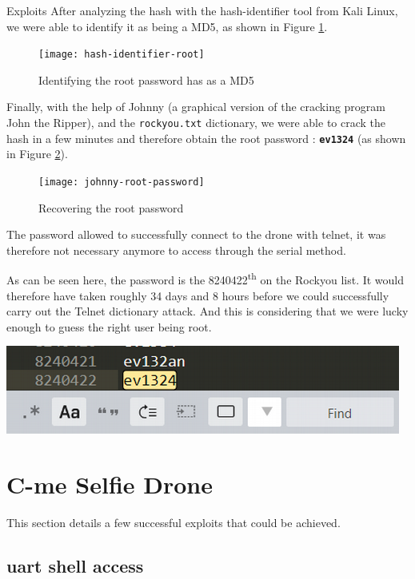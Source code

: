 \begin{chaptercover}{Exploits}
After analyzing the hash with the hash-identifier tool from Kali Linux, we were able to identify it as being a MD5, as shown in Figure \ref{fig:hash-identifier-root}.

\begin{figure}[H]
  \centering
  \texttt{[image: hash-identifier-root]}
  \caption{Identifying the root password has as a MD5}
  \label{fig:hash-identifier-root}
\end{figure}

Finally, with the help of Johnny (a graphical version of the cracking program John the Ripper), and the \texttt{rockyou.txt} dictionary, we were able to crack the hash in a few minutes and therefore obtain the root password : \textbf{\texttt{ev1324}} (as shown in Figure \ref{fig:johnny-root-password}).

\begin{figure}[H]
  \centering
  \texttt{[image: johnny-root-password]}
  \caption{Recovering the root password}
  \label{fig:johnny-root-password}
\end{figure}

The password allowed to successfully connect to the drone with telnet, it was therefore not necessary anymore to access through the serial method.

\begin{tip}
As can be seen here, the password is the 8240422\textsuperscript{th} on the Rockyou list. It would therefore have taken roughly 34 days and 8 hours before we could successfully carry out the Telnet dictionary attack. And this is considering that we were lucky enough to guess the right user being root.

\begin{center}
\includegraphics[width=.5\linewidth]{figures/rockyou-root-password}
\end{center}
\end{tip}

\section{C-me Selfie Drone}

This section details a few successful exploits that could be achieved.

\subsection{\acrshort{uart} shell access}


\end{chaptercover}
